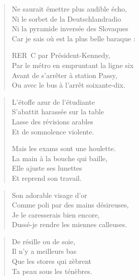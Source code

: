 \begin{verse}
  Ne saurait émettre plus audible écho,\\  %
  Ni le sorbet de la Deutschlandradio\\  %
  Ni la pyramide inversée des Slovaques\\  %
  Car je sais où est la plus belle baraque :

  RER~C  par Président-Kennedy,\\  %
  Par le métro en empruntant la ligne six\\  %
  Avant de s’arrêter à station Passy,\\  %
  Ou avec le bus à l’arrêt soixante-dix.
\end{verse}

\begin{verse}%
  \quatrain%
  L’étoffe azur de l’étudiante\\  %
  S’abattit harassée sur la table\\  %
  Lasse des révisions arables\\  %
  Et de somnolence violente.

  Mais les exams sont  une houlette.\\  %
  La main à la bouche qui baille,\\  %
  Elle ajuste ses lunettes\\  %
  Et reprend son travail.
\end{verse}

\begin{verse}%
  \quatrain%
  Son adorable visage d’or\\  %
  Comme poli par des mains désireuses,\\  %
  Je le caresserais bien encore,\\  %
  Dussé-je rendre les miennes calleuses.
\end{verse}

\begin{verse}%
  \quatrain%
  De résille ou de soie,\\  %
  Il n’y a meilleurs bas\\  %
  Que les stores qui zèbrent\\  %
  Ta peau sous les ténèbres.
\end{verse}


